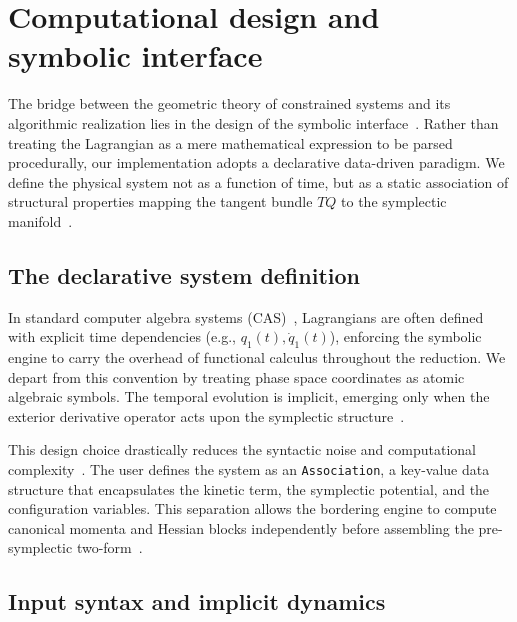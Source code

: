 \documentclass[11pt,a4paper]{article}
\begin{document}
\section{Computational design and symbolic interface}\label{sec5}



The bridge between the geometric theory of constrained systems and its algorithmic realization lies in the design of the symbolic interface~\cite{Wolfram2002,Gorard2024}. Rather than treating the Lagrangian as a mere mathematical expression to be parsed procedurally, our implementation adopts a {declarative data-driven paradigm}. We define the physical system not as a function of time, but as a static association of structural properties mapping the tangent bundle $TQ$ to the symplectic manifold~\cite{ArnoldBook,Marsden1999}.



\subsection{The declarative system definition}



In standard computer algebra systems (CAS)~\cite{Fateman1991,Geddes1992}, Lagrangians are often defined with explicit time dependencies (e.g., $q_1(t), \dot{q}_1(t)$), enforcing the symbolic engine to carry the overhead of functional calculus throughout the reduction. We depart from this convention by treating phase space coordinates as atomic algebraic symbols. The temporal evolution is implicit, emerging only when the {exterior derivative operator} acts upon the symplectic structure~\cite{ArnoldBook,Nakahara2003}.


This design choice drastically reduces the syntactic noise and computational complexity~\cite{Wolfram2002}. The user defines the system as an \texttt{Association}, a key-value data structure that encapsulates the kinetic term, the symplectic potential, and the configuration variables. This separation allows the bordering engine to compute canonical momenta and Hessian blocks independently before assembling the pre-symplectic two-form~\cite{FaddeevJackiw1988,BarcelosNetoWotzasek1992}.



\subsection{Input syntax and implicit dynamics}
\end{document}
